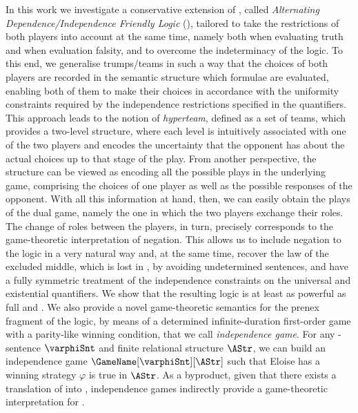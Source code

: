 \documentclass[authoryear]{elsarticle}
\begin{document}
In this work we investigate a conservative extension of \IF, called
\emph{Alternating Dependence/Independence Friendly Logic} (\ADIF), tailored to
take the restrictions of both players into account at the same time, namely both
when evaluating truth and when evaluation falsity, and to overcome the
indeterminacy of the logic.
To this end, we generalise trumps/teams in such a way that the choices of both
players are recorded in the semantic structure \wrt which formulae are
evaluated, enabling both of them to make their choices in accordance with the
uniformity constraints required by the independence restrictions specified in
the quantifiers.
This approach leads to the notion of \emph{hyperteam}, defined as a set of
teams, which provides a two-level structure, where each level is intuitively
associated with one of the two players and encodes the uncertainty that the
opponent has about the actual choices up to that stage of the play.
From another perspective, the structure can be viewed as encoding all the
possible plays in the underlying game, comprising the choices of one player as
well as the possible responses of the opponent.
%
With all this information at hand, then, we can easily obtain the plays of the
dual game, namely the one in which the two players exchange their roles.
The change of roles between the players, in turn, precisely corresponds to the
game-theoretic interpretation of negation.
This allows us to include negation to the logic in a very natural way and, at
the same time, recover the law of the excluded middle, which is lost in \IF,
by avoiding undetermined sentences, and have a fully symmetric treatment of
the independence constraints on the universal and existential quantifiers.
%
We show that the resulting logic is at least as powerful as full \SOL and \TL.
We also provide a novel game-theoretic semantics for the prenex fragment of the
logic, by means of a determined infinite-duration first-order game with a
parity-like winning condition, that we call \emph{independence game}.
For any \ADIF-sentence $\varphiSnt$ and finite relational structure $\AStr$, we
can build an independence game $\GameName[\varphiSnt][\AStr]$ such that Eloise
has a winning strategy \iff $\varphi$ is true in $\AStr$.
As a byproduct, given that there exists a translation of \TL into \ADIF,
independence games indirectly provide a game-theoretic interpretation for \TL.
\end{document}
